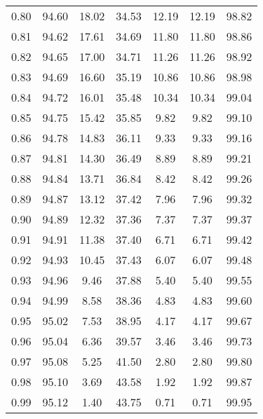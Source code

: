 \begin{tabular}{|c|c|c|c|c|c|c|}
      0.80 &     94.60 &     18.02 &      34.53 &   12.19 &      12.19 &         98.82 \\
      0.81 &     94.62 &     17.61 &      34.69 &   11.80 &      11.80 &         98.86 \\
      0.82 &     94.65 &     17.00 &      34.71 &   11.26 &      11.26 &         98.92 \\
      0.83 &     94.69 &     16.60 &      35.19 &   10.86 &      10.86 &         98.98 \\
      0.84 &     94.72 &     16.01 &      35.48 &   10.34 &      10.34 &         99.04 \\
      0.85 &     94.75 &     15.42 &      35.85 &    9.82 &       9.82 &         99.10 \\
      0.86 &     94.78 &     14.83 &      36.11 &    9.33 &       9.33 &         99.16 \\
      0.87 &     94.81 &     14.30 &      36.49 &    8.89 &       8.89 &         99.21 \\
      0.88 &     94.84 &     13.71 &      36.84 &    8.42 &       8.42 &         99.26 \\
      0.89 &     94.87 &     13.12 &      37.42 &    7.96 &       7.96 &         99.32 \\
      0.90 &     94.89 &     12.32 &      37.36 &    7.37 &       7.37 &         99.37 \\
      0.91 &     94.91 &     11.38 &      37.40 &    6.71 &       6.71 &         99.42 \\
      0.92 &     94.93 &     10.45 &      37.43 &    6.07 &       6.07 &         99.48 \\
      0.93 &     94.96 &      9.46 &      37.88 &    5.40 &       5.40 &         99.55 \\
      0.94 &     94.99 &      8.58 &      38.36 &    4.83 &       4.83 &         99.60 \\
      0.95 &     95.02 &      7.53 &      38.95 &    4.17 &       4.17 &         99.67 \\
      0.96 &     95.04 &      6.36 &      39.57 &    3.46 &       3.46 &         99.73 \\
      0.97 &     95.08 &      5.25 &      41.50 &    2.80 &       2.80 &         99.80 \\
      0.98 &     95.10 &      3.69 &      43.58 &    1.92 &       1.92 &         99.87 \\
      0.99 &     95.12 &      1.40 &      43.75 &    0.71 &       0.71 &         99.95 \\
\bottomrule
\end{tabular}
